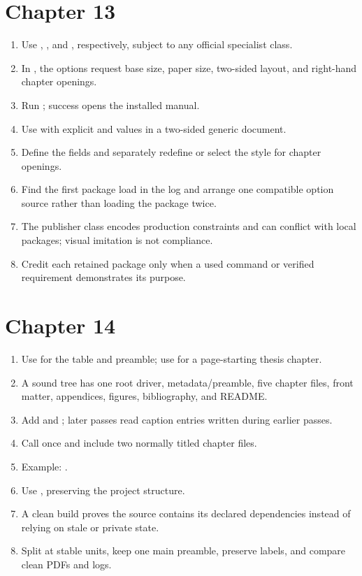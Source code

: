\section*{Chapter 13}
\begin{enumerate}[label=13.\arabic*,leftmargin=2.4em,itemsep=0.45em]
  \item Use , , and , respectively, subject
        to any official specialist class.
  \item In , the options request base size,
        paper size, two-sided layout, and right-hand chapter openings.
  \item Run ; success opens the installed manual.
  \item Use  with explicit  and  values in
        a two-sided generic document.
  \item Define the  fields and separately redefine or select the
         style for chapter openings.
  \item Find the first package load in the log and arrange one compatible option
        source rather than loading the package twice.
  \item The publisher class encodes production constraints and can conflict
        with local packages; visual imitation is not compliance.
  \item Credit each retained package only when a used command or verified
        requirement demonstrates its purpose.
\end{enumerate}

\section*{Chapter 14}
\begin{enumerate}[label=14.\arabic*,leftmargin=2.4em,itemsep=0.45em]
  \item Use  for the table and preamble; use  for a
        page-starting thesis chapter.
  \item A sound tree has one root driver, metadata/preamble, five chapter files,
        front matter, appendices, figures, bibliography, and README.
  \item Add  and ; later passes read caption
        entries written during earlier passes.
  \item Call  once and include two normally titled chapter files.
  \item Example: 
        .
  \item Use , preserving the project structure.
  \item A clean build proves the source contains its declared dependencies
        instead of relying on stale or private state.
  \item Split at stable units, keep one main preamble, preserve labels, and
        compare clean PDFs and logs.
\end{enumerate}

